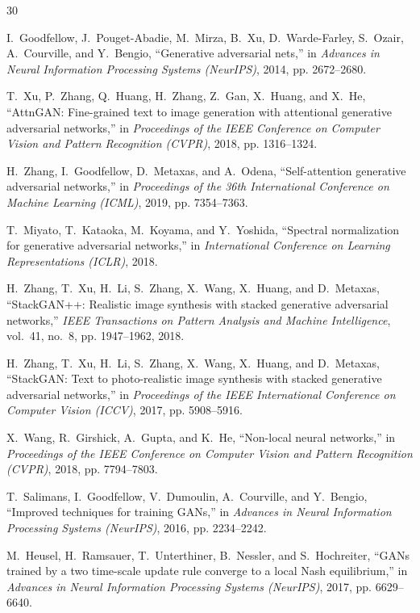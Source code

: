 \documentclass[conference]{IEEEtran}
\begin{document}
\begin{thebibliography}{30}

I.~Goodfellow, J.~Pouget-Abadie, M.~Mirza, B.~Xu, D.~Warde-Farley, S.~Ozair, A.~Courville, and Y.~Bengio, ``Generative adversarial nets,'' in \textit{Advances in Neural Information Processing Systems (NeurIPS)}, 2014, pp. 2672--2680.

T.~Xu, P.~Zhang, Q.~Huang, H.~Zhang, Z.~Gan, X.~Huang, and X.~He, ``AttnGAN: Fine-grained text to image generation with attentional generative adversarial networks,'' in \textit{Proceedings of the IEEE Conference on Computer Vision and Pattern Recognition (CVPR)}, 2018, pp. 1316--1324.

H.~Zhang, I.~Goodfellow, D.~Metaxas, and A.~Odena, ``Self-attention generative adversarial networks,'' in \textit{Proceedings of the 36th International Conference on Machine Learning (ICML)}, 2019, pp. 7354--7363.

T.~Miyato, T.~Kataoka, M.~Koyama, and Y.~Yoshida, ``Spectral normalization for generative adversarial networks,'' in \textit{International Conference on Learning Representations (ICLR)}, 2018.

H.~Zhang, T.~Xu, H.~Li, S.~Zhang, X.~Wang, X.~Huang, and D.~Metaxas, ``StackGAN++: Realistic image synthesis with stacked generative adversarial networks,'' \textit{IEEE Transactions on Pattern Analysis and Machine Intelligence}, vol.~41, no.~8, pp. 1947--1962, 2018.

H.~Zhang, T.~Xu, H.~Li, S.~Zhang, X.~Wang, X.~Huang, and D.~Metaxas, ``StackGAN: Text to photo-realistic image synthesis with stacked generative adversarial networks,'' in \textit{Proceedings of the IEEE International Conference on Computer Vision (ICCV)}, 2017, pp. 5908--5916.

X.~Wang, R.~Girshick, A.~Gupta, and K.~He, ``Non-local neural networks,'' in \textit{Proceedings of the IEEE Conference on Computer Vision and Pattern Recognition (CVPR)}, 2018, pp. 7794--7803.

T.~Salimans, I.~Goodfellow, V.~Dumoulin, A.~Courville, and Y.~Bengio, ``Improved techniques for training GANs,'' in \textit{Advances in Neural Information Processing Systems (NeurIPS)}, 2016, pp. 2234--2242.

M.~Heusel, H.~Ramsauer, T.~Unterthiner, B.~Nessler, and S.~Hochreiter, ``GANs trained by a two time-scale update rule converge to a local Nash equilibrium,'' in \textit{Advances in Neural Information Processing Systems (NeurIPS)}, 2017, pp. 6629--6640.


\end{thebibliography}
\end{document}
